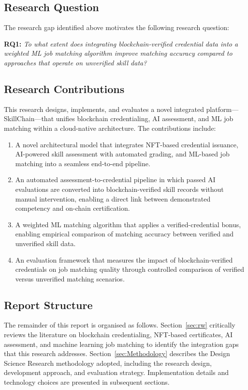 \subsection{Research Question}
\label{sec:ResearchQuestions}

The research gap identified above motivates the following research question:

\medskip
\noindent\textbf{RQ1:} \textit{To what extent does integrating blockchain-verified credential data into a weighted ML job matching algorithm improve matching accuracy compared to approaches that operate on unverified skill data?}
\medskip

\subsection{Research Contributions}
\label{sec:ResearchContributions}

This research designs, implements, and evaluates a novel integrated platform---SkillChain---that unifies blockchain credentialing, AI assessment, and ML job matching within a cloud-native architecture. The contributions include:

\begin{enumerate}
    \item A novel architectural model that integrates NFT-based credential issuance, AI-powered skill assessment with automated grading, and ML-based job matching into a seamless end-to-end pipeline.
    \item An automated assessment-to-credential pipeline in which passed AI evaluations are converted into blockchain-verified skill records without manual intervention, enabling a direct link between demonstrated competency and on-chain certification.
    \item A weighted ML matching algorithm that applies a verified-credential bonus, enabling empirical comparison of matching accuracy between verified and unverified skill data.
    \item An evaluation framework that measures the impact of blockchain-verified credentials on job matching quality through controlled comparison of verified versus unverified matching scenarios.
\end{enumerate}

\subsection{Report Structure}
\label{sec:ReportStructure}

The remainder of this report is organised as follows. Section~\ref{sec:rw} critically reviews the literature on blockchain credentialing, NFT-based certificates, AI assessment, and machine learning job matching to identify the integration gaps that this research addresses. Section~\ref{sec:Methodology} describes the Design Science Research methodology adopted, including the research design, development approach, and evaluation strategy. Implementation details and technology choices are presented in subsequent sections.
